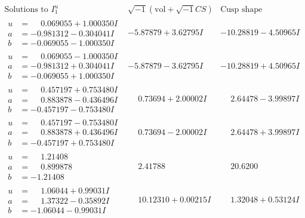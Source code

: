 \documentclass[1p]{elsarticle_modified}
\theoremstyle{definition}
\newcommand{\I}{\sqrt{-1}}
\begin{document}
$$\begin{array}{c|c|c}  
\text{Solutions to }I^u_{1}& \I (\text{vol} + \sqrt{-1}CS) & \text{Cusp shape}\\
 \hline 
\begin{aligned}
u &= \phantom{-}0.069055 + 1.000350 I \\
a &= -0.981312 - 0.304041 I \\
b &= -0.069055 - 1.000350 I\end{aligned}
 & -5.87879 + 3.62795 I & -10.28819 - 4.50965 I \\ \hline\begin{aligned}
u &= \phantom{-}0.069055 - 1.000350 I \\
a &= -0.981312 + 0.304041 I \\
b &= -0.069055 + 1.000350 I\end{aligned}
 & -5.87879 - 3.62795 I & -10.28819 + 4.50965 I \\ \hline\begin{aligned}
u &= \phantom{-}0.457197 + 0.753480 I \\
a &= \phantom{-}0.883878 - 0.436496 I \\
b &= -0.457197 - 0.753480 I\end{aligned}
 & \phantom{-}0.73694 + 2.00002 I & \phantom{-}2.64478 - 3.99897 I \\ \hline\begin{aligned}
u &= \phantom{-}0.457197 - 0.753480 I \\
a &= \phantom{-}0.883878 + 0.436496 I \\
b &= -0.457197 + 0.753480 I\end{aligned}
 & \phantom{-}0.73694 - 2.00002 I & \phantom{-}2.64478 + 3.99897 I \\ \hline\begin{aligned}
u &= \phantom{-}1.21408\phantom{ +0.000000I} \\
a &= \phantom{-}0.899878\phantom{ +0.000000I} \\
b &= -1.21408\phantom{ +0.000000I}\end{aligned}
 & \phantom{-}2.41788\phantom{ +0.000000I} & \phantom{-}20.6200\phantom{ +0.000000I} \\ \hline\begin{aligned}
u &= \phantom{-}1.06044 + 0.99031 I \\
a &= \phantom{-}1.37322 - 0.35892 I \\
b &= -1.06044 - 0.99031 I\end{aligned}
 & \phantom{-}10.12310 + 0.00215 I & \phantom{-}1.32048 + 0.53124 I \\ \hline\begin{aligned}

\end{aligned}
\end{array}$$
\end{document}
